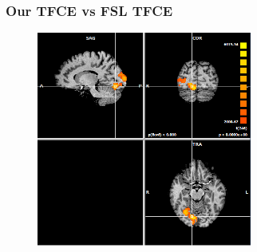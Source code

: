 \documentclass{beamer}
\begin{document}
\begin{frame}
\frametitle{Our TFCE vs FSL TFCE}
\begin{figure}
	\centering
        \includegraphics[width=0.63\textwidth]{Images/Brainvoyager-TFCE83187129.png}
\end{figure}
\end{frame}
\end{document}
